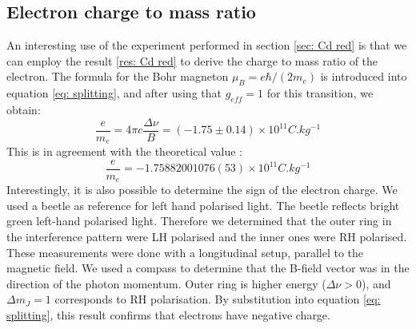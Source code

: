\documentclass[11pt]{article}
\begin{document}
\subsection{Electron charge to mass ratio} \label{sec: e/m ratio}
An interesting use of the experiment performed in section \ref{sec: Cd red} is that we can employ the result \ref{res: Cd red} to derive the charge to mass ratio of the electron. The formula for the Bohr magneton $\mu_B = e \hbar / (2 m_e)$ is introduced into equation \eqref{eq: splitting}, and after using that $g_{eff} = 1$ for this transition, we obtain: 
\begin{equation}
    \frac{e}{m_e} = 4 \pi c \frac{\Delta \nu}{B} = (-1.75 \pm 0.14) \times 10^{11} \si{C.kg^{-1}}
\end{equation}
This is in agreement with the theoretical value \cite{CODATA2018}: 
\begin{equation}
    \frac{e}{m_e} = -1.75882001076(53) \times 10^{11} \si{C.kg^{-1}}
\end{equation}
Interestingly, it is also possible to determine the sign of the electron charge. We used a beetle as reference for left hand polarised light. The beetle reflects bright green left-hand polarised light. Therefore we determined that the outer ring in the interference pattern were LH polarised and the inner ones were RH polarised. These measurements were done with a longitudinal setup, parallel to the magnetic field. We used a compass to determine that the B-field vector was in the direction of the photon momentum. Outer ring is higher energy ($\Delta \nu > 0$), and $ \Delta m_J = 1$ corresponds to RH polarisation. By substitution into equation \eqref{eq: splitting}, this result confirms that electrons have negative charge. 
\end{document}
